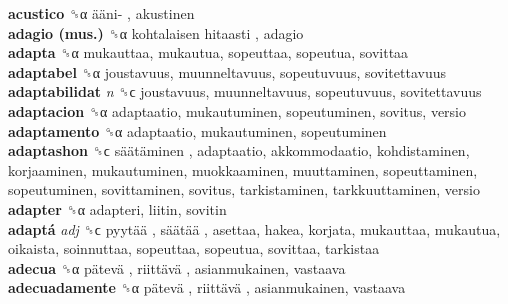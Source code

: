 \textbf{acustico} ␝α   ääni- , akustinen  \\
\textbf{adagio (mus.)} ␝α   kohtalaisen hitaasti , adagio  \\
\textbf{adapta} ␝α  mukauttaa, mukautua, sopeuttaa, sopeutua, sovittaa  \\
\textbf{adaptabel} ␝α  joustavuus, muunneltavuus, sopeutuvuus, sovitettavuus  \\
\textbf{adaptabilidat} \emph{n}  ␝ϲ  joustavuus, muunneltavuus, sopeutuvuus, sovitettavuus  \\
\textbf{adaptacion} ␝α  adaptaatio, mukautuminen, sopeutuminen, sovitus, versio  \\
\textbf{adaptamento} ␝α  adaptaatio, mukautuminen, sopeutuminen  \\
\textbf{adaptashon} ␝ϲ   säätäminen , adaptaatio, akkommodaatio, kohdistaminen, korjaaminen, mukautuminen, muokkaaminen, muuttaminen, sopeuttaminen, sopeutuminen, sovittaminen, sovitus, tarkistaminen, tarkkuuttaminen, versio  \\
\textbf{adapter} ␝α  adapteri, liitin, sovitin  \\
\textbf{adaptá} \emph{adj}  ␝ϲ   pyytää ,  säätää , asettaa, hakea, korjata, mukauttaa, mukautua, oikaista, soinnuttaa, sopeuttaa, sopeutua, sovittaa, tarkistaa  \\
\textbf{adecua} ␝α   pätevä ,  riittävä , asianmukainen, vastaava  \\
\textbf{adecuadamente} ␝α   pätevä ,  riittävä , asianmukainen, vastaava  \\
